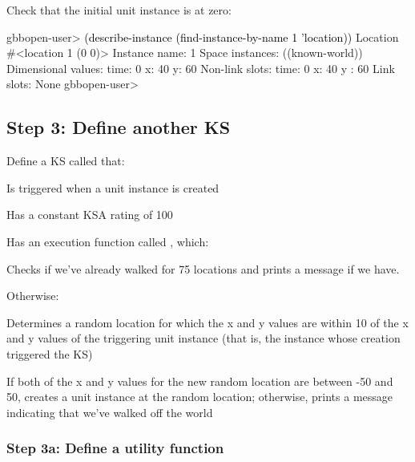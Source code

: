 \documentclass[10pt,twoside,english,pdftex]{article}
\begin{document}
%
%
Check that the initial  unit instance is at 
zero:
%
\W\supp
\begin{example}
\textcolor{darkergray}{%
  gbbopen-user> \textcolor{black}{(describe-instance (find-instance-by-name 1 'location))}
  Location #<location 1 (0 0)>
    Instance name: 1
    Space instances: ((known-world))
    Dimensional values:
      time:  0
      x:  40
      y:  60
    Non-link slots:
      time:  0
      x:  40
      y : 60
    Link slots: None
  gbbopen-user>}
\end{example}

\subsection*{Step 3: Define another KS}

Define a KS called  that:
%
\begin{tightitemize}
\item Is triggered when a  unit instance is created
\item Has a constant KSA rating of 100
\item Has an execution function called ,
  which:
\begin{tightitemize}
\item Checks if we've already walked for 75 locations and prints a message if
  we have. 
\item Otherwise:
\begin{tightitemize}
\item Determines a random location for which the x and y values are within 10
  of the x and y values of the triggering unit instance (that is, the
   instance whose creation triggered the
   KS)
\item If both of the x and y values for the new random location are between
  -50 and 50, creates a  unit instance at the random
  location; otherwise, prints a message indicating that we've walked off the
  world
\end{tightitemize}
\end{tightitemize}
\end{tightitemize}

\subsubsection*{Step 3a: Define a utility function}
\end{document}
